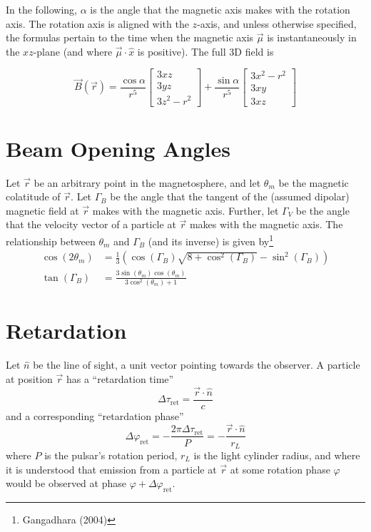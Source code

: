 \documentclass{article}
\newcommand{\phase}{\varphi}
\begin{document}
In the following, $\alpha$ is the angle that the magnetic axis makes with the rotation axis.
The rotation axis is aligned with the $z$-axis, and unless otherwise specified, the formulas pertain to the time when the magnetic axis $\vec{\mu}$ is instantaneously in the $xz$-plane (and where $\vec{\mu}\cdot\hat{x}$ is positive).
The full 3D field is

\begin{equation}
    \vec{B}(\vec{r}) =
    \frac{\cos\alpha}{r^5}\begin{bmatrix}
        3xz \\
        3yz \\
        3z^2 - r^2
    \end{bmatrix} + 
    \frac{\sin\alpha}{r^5}\begin{bmatrix}
        3x^2 - r^2 \\
        3xy \\
        3xz
    \end{bmatrix}
\end{equation}

\section{Beam Opening Angles}

Let $\vec{r}$ be an arbitrary point in the magnetosphere, and let $\theta_m$ be the magnetic colatitude of $\vec{r}$.
Let $\Gamma_B$ be the angle that the tangent of the (assumed dipolar) magnetic field at $\vec{r}$ makes with the magnetic axis.
Further, let $\Gamma_V$ be the angle that the velocity vector of a particle at $\vec{r}$ makes with the magnetic axis.
The relationship between $\theta_m$ and $\Gamma_B$ (and its inverse) is given by\footnote{Gangadhara (2004)}
\begin{equation}
    \begin{aligned}
        \cos(2\theta_m) &= \frac13\left(\cos(\Gamma_B)\sqrt{8 + \cos^2(\Gamma_B)} - \sin^2(\Gamma_B)\right) \\
        \tan(\Gamma_B)  &= \frac{3\sin(\theta_m)\cos(\theta_m)}{3\cos^2(\theta_m)+1}
    \end{aligned}
\end{equation}

\section{Retardation}

Let $\hat{n}$ be the line of sight, a unit vector pointing towards the observer.
A particle at position $\vec{r}$ has a ``retardation time''
\begin{equation}
    \Delta\tau_\text{ret} = \frac{\vec{r}\cdot\hat{n}}{c}
\end{equation}
and a corresponding ``retardation phase''
\begin{equation}
    \Delta\phase_\text{ret} = -\frac{2\pi\Delta\tau_\text{ret}}{P} = -\frac{\vec{r}\cdot\hat{n}}{r_L}
\end{equation}
where $P$ is the pulsar's rotation period, $r_L$ is the light cylinder radius, and where it is understood that emission from a particle at $\vec{r}$ at some rotation phase $\phase$ would be observed at phase $\phase + \Delta\phase_\text{ret}$.
\end{document}
